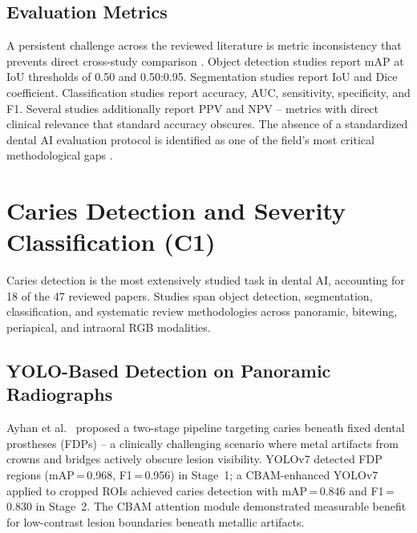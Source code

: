 \documentclass[conference]{IEEEtran}
\begin{document}
\subsection{Evaluation Metrics}

A persistent challenge across the reviewed literature is metric
inconsistency that prevents direct cross-study comparison
\cite{iacob2025automated,bonfanti2025deep,khubrani2025detection,zanini2024systematic}.
Object detection studies report mAP at IoU thresholds of 0.50 and
0.50:0.95. Segmentation studies report IoU and Dice coefficient.
Classification studies report accuracy, AUC, sensitivity, specificity,
and F1. Several studies \cite{chen2023deep,bilal2024pdcnet,zancan2025ai}
additionally report PPV and NPV -- metrics with direct clinical
relevance that standard accuracy obscures. The absence of a standardized
dental AI evaluation protocol is identified as one of the field's most
critical methodological gaps
\cite{iacob2025automated,luke2025accuracy,khubrani2025detection}.

\section{Caries Detection and Severity Classification (C1)}
\label{sec:caries}

Caries detection is the most extensively studied task in dental AI,
accounting for 18 of the 47 reviewed papers. Studies span object
detection, segmentation, classification, and systematic review
methodologies across panoramic, bitewing, periapical, and intraoral RGB
modalities.

\subsection{YOLO-Based Detection on Panoramic Radiographs}

Ayhan et al.~\cite{ayhan2025detection} proposed a two-stage pipeline
targeting caries beneath fixed dental prostheses (FDPs) -- a clinically
challenging scenario where metal artifacts from crowns and bridges
actively obscure lesion visibility. YOLOv7 detected FDP regions
(mAP\,=\,0.968, F1\,=\,0.956) in Stage~1; a CBAM-enhanced YOLOv7
applied to cropped ROIs achieved caries detection with mAP\,=\,0.846
and F1\,=\,0.830 in Stage~2. The CBAM attention module demonstrated
measurable benefit for low-contrast lesion boundaries beneath metallic
artifacts.
\end{document}
